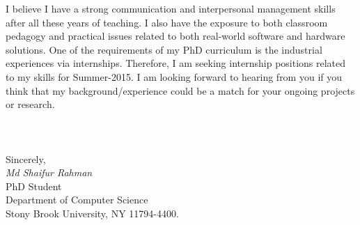 \documentclass[letterpaper, 11pt]{article}
\begin{document}
I believe I have a strong communication and interpersonal management skills
after all these years of teaching. I also have the exposure to both classroom pedagogy and practical
issues related to both real-world software and hardware solutions. One of the
requirements of my PhD curriculum is the industrial experiences via internships.
Therefore, I am seeking internship positions related to my skills for
Summer-2015. I am looking forward to hearing from you if you think that my
background/experience could be a match for your ongoing projects or research.\\
\\
\\
\\
Sincerely,\\ 
\textit{Md Shaifur Rahman}\\ 
PhD Student\\
Department of Computer Science\\
Stony Brook University, NY 11794-4400.\\
\end{document}
